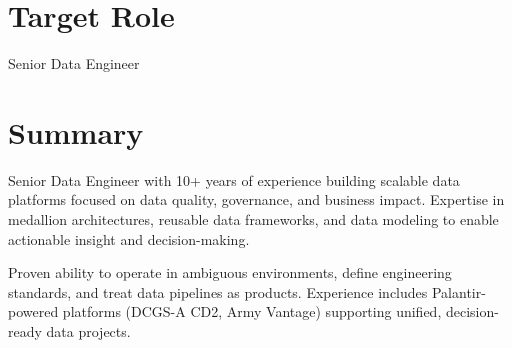 \section*{Target Role}
\begin{center}
	\vspace{-0.4em}
	Senior Data Engineer
\end{center}
\vspace{-1em}


\section*{Summary}
\vspace{-0.3em}

Senior Data Engineer with 10+ years of experience building scalable data platforms focused on data quality, governance, and business impact. Expertise in medallion architectures, reusable data frameworks, and data modeling to enable actionable insight and decision-making.

Proven ability to operate in ambiguous environments, define engineering standards, and treat data pipelines as products. Experience includes Palantir-powered platforms (DCGS-A CD2, Army Vantage) supporting unified, decision-ready data projects.